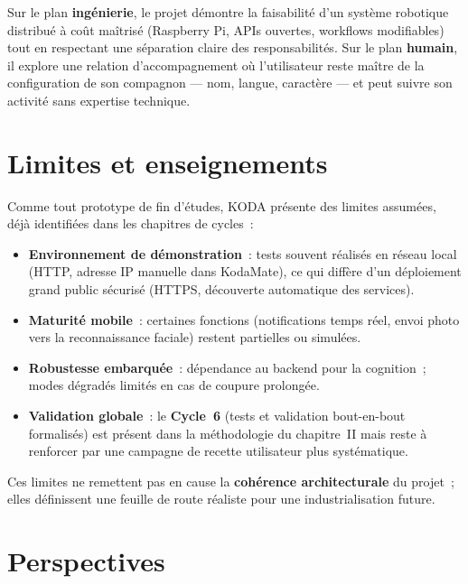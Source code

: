 \documentclass[a4paper,12pt]{report}
\begin{document}
	Sur le plan \textbf{ingénierie}, le projet démontre la faisabilité d'un système
	robotique distribué à coût maîtrisé (Raspberry Pi, APIs ouvertes, workflows
	modifiables) tout en respectant une séparation claire des responsabilités. Sur le
	plan \textbf{humain}, il explore une relation d'accompagnement où l'utilisateur
	reste maître de la configuration de son compagnon --- nom, langue, caractère ---
	et peut suivre son activité sans expertise technique.
	
	\section{Limites et enseignements}
	
	Comme tout prototype de fin d'études, KODA présente des limites assumées, déjà
	identifiées dans les chapitres de cycles~:
	\begin{itemize}
		\item \textbf{Environnement de démonstration}~: tests souvent réalisés en réseau
		local (HTTP, adresse IP manuelle dans KodaMate), ce qui diffère d'un déploiement
		grand public sécurisé (HTTPS, découverte automatique des services).
		\item \textbf{Maturité mobile}~: certaines fonctions (notifications temps réel,
		envoi photo vers la reconnaissance faciale) restent partielles ou simulées.
		\item \textbf{Robustesse embarquée}~: dépendance au backend pour la cognition~;
		modes dégradés limités en cas de coupure prolongée.
		\item \textbf{Validation globale}~: le \textbf{Cycle~6} (tests et validation
		bout-en-bout formalisés) est présent dans la méthodologie du chapitre~II mais
		reste à renforcer par une campagne de recette utilisateur plus systématique.
	\end{itemize}
	
	Ces limites ne remettent pas en cause la \textbf{cohérence architecturale} du
	projet~; elles définissent une feuille de route réaliste pour une industrialisation
	future.
	
	\section{Perspectives}
	
\end{document}
